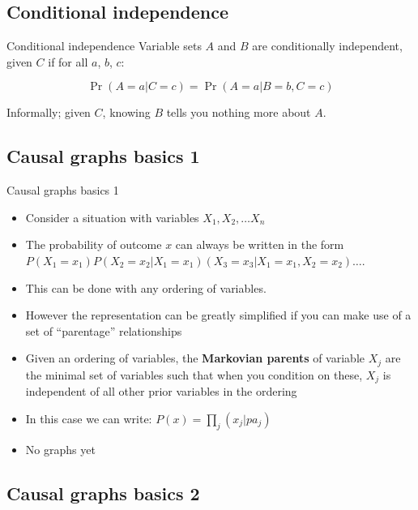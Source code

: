 \documentclass[
  11pt,
  ignorenonframetext,
]{beamer}
\providecommand{\tightlist}{%
  \setlength{\itemsep}{0pt}\setlength{\parskip}{0pt}}\usepackage{longtable,booktabs,array}
\begin{document}
\hypertarget{conditional-independence}{%
\subsection{Conditional independence}\label{conditional-independence}}

\begin{frame}{Conditional independence}
Variable sets \(A\) and \(B\) are conditionally independent, given \(C\)
if for all \(a\), \(b\), \(c\):

\[\Pr(A = a | C = c) = \Pr(A = a | B = b, C = c)\]

Informally; given \(C\), knowing \(B\) tells you nothing more about
\(A\).
\end{frame}

\hypertarget{causal-graphs-basics-1}{%
\subsection{Causal graphs basics 1}\label{causal-graphs-basics-1}}

\begin{frame}{Causal graphs basics 1}
\begin{itemize}
\tightlist
\item
  Consider a situation with variables \(X_1, X_2, \dots X_n\)
\item
  The probability of outcome \(x\) can always be written in the form
  \(P(X_1 = x_1)P(X_2 = x_2|X_1=x_1)(X_3 = x_3|X_1=x_1, X_2 = x_2)\dots\).
\item
  This can be done with any ordering of variables.
\item
  However the representation can be greatly simplified if you can make
  use of a set of ``parentage'' relationships
\item
  Given an ordering of variables, the \textbf{Markovian parents} of
  variable \(X_j\) are the minimal set of variables such that when you
  condition on these, \(X_j\) is independent of all other prior
  variables in the ordering
\item
  In this case we can write: \(P(x) = \prod_j(x_j | pa_j)\)
\item
  No graphs yet
\end{itemize}
\end{frame}

\hypertarget{causal-graphs-basics-2}{%
\subsection{Causal graphs basics 2}\label{causal-graphs-basics-2}}
\end{document}
